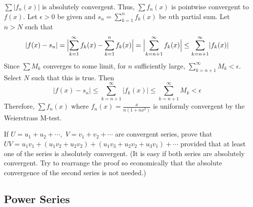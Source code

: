 \begin{exercise}
  \(\sum\lvert f_n(x)\rvert\) is absolutely convergent.
  Thus, \(\sum f_n(x)\) is pointwise convergent to \(f(x)\).
  Let \(\epsilon > 0\) be given and \(s_n = \sum_{k = 1}^nf_k(x)\) be \(n\)th
  partial sum.
  Let \(n > N\) such that
  \[
  \lvert f(x) - s_n\rvert = \Bigl\lvert\sum_{k = 1}^{\infty}f_k(x) -
  \sum_{k = 1}^nf_k(x)\Bigr\rvert =
  \Bigl\lvert\sum_{k = n + 1}^{\infty}f_k(x)\Bigr\rvert\leq
  \sum_{k = n + 1}^{\infty}\lvert f_k(x)\rvert
  \]
  Since \(\sum M_k\) converges to some limit, for \(n\) sufficiently large,
  \(\sum_{k = n + 1}^{\infty}M_k < \epsilon\).
  Select \(N\) such that this is true.
  Then
  \[
  \lvert f(x) - s_n\rvert\leq\sum_{k = n + 1}^{\infty}\lvert f_k(x)\rvert\leq
  \sum_{k = n + 1}^{\infty}M_k < \epsilon
  \]
  Therefore, \(\sum f_n(x)\) where \(f_n(x) = \frac{x}{n(1 + nx^2)}\) is
  uniformly convergent by the Weierstrass M-test.
\item
  If \(U = u_1 + u_2 + \cdots,\) \(V = v_1 + v_2 + \cdots\) are convergent
  series, prove that
  \(UV = u_1v_1 + (u_1v_2 + u_2v_2) + (u_1v_3 + u_2v_2 + u_3v_1) + \cdots\)
  provided that at least one of the series is absolutely convergent.
  (It is easy if both series are absolutely convergent.
  Try to rearrange the proof so economically that the absolute convergence of
  the second series is not needed.)
\end{exercise}

\subsection{Power Series}

